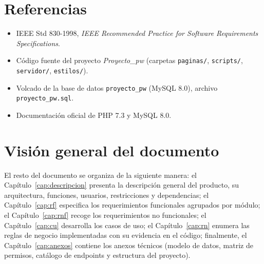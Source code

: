 \section{Referencias}

\begin{itemize}
    \item IEEE Std 830-1998, \textit{IEEE Recommended Practice for Software
          Requirements Specifications}.
    \item Código fuente del proyecto \textit{Proyecto\_pw} (carpetas
          \texttt{paginas/}, \texttt{scripts/}, \texttt{servidor/},
          \texttt{estilos/}).
    \item Volcado de la base de datos \texttt{proyecto\_pw} (MySQL 8.0),
          archivo \texttt{proyecto\_pw.sql}.
    \item Documentación oficial de PHP 7.3 y MySQL 8.0.
\end{itemize}

\section{Visión general del documento}

El resto del documento se organiza de la siguiente manera: el
Capítulo~\ref{cap:descripcion} presenta la descripción general del producto,
su arquitectura, funciones, usuarios, restricciones y dependencias; el
Capítulo~\ref{cap:rf} especifica los requerimientos funcionales agrupados por
módulo; el Capítulo~\ref{cap:rnf} recoge los requerimientos no funcionales;
el Capítulo~\ref{cap:cu} desarrolla los casos de uso; el
Capítulo~\ref{cap:rn} enumera las reglas de negocio implementadas con su
evidencia en el código; finalmente, el Capítulo~\ref{cap:anexos} contiene los
anexos técnicos (modelo de datos, matriz de permisos, catálogo de endpoints y
estructura del proyecto).
